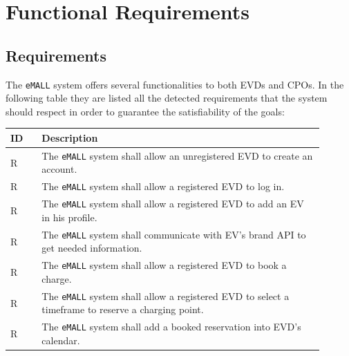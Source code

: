 \section{Functional Requirements}
\label{sec:functional_requirements}%

\subsection{Requirements}
\label{subsec: requirements}%
The \verb|eMALL| system offers several functionalities to both EVDs and CPOs.
In the following table they are listed all the detected requirements that the system should respect in order to guarantee
the satisfiability of the goals:
\newpage
{}
\setcounter{req}{1}
\newcommand{\creq}{\thereq\stepcounter{req}}
\begin{center}
    \begin{longtable}{|l|p{0.9\linewidth}|}
        \hline
        \textbf{ID} & \textbf{Description}                                                                                                                             \\
        \hline
        R\creq      & The \verb|eMALL| system shall allow an unregistered EVD to create an account.                                                                    \\
        \hline
        R\creq      & The \verb|eMALL| system shall allow a registered EVD to log in.                                                                                  \\
        \hline
        R\creq      & The \verb|eMALL| system shall allow a registered EVD to add an EV in his profile.                                                                \\
        \hline
        R\creq      & The \verb|eMALL| system shall communicate with EV's brand API to get needed information.                                                         \\
        \hline
        R\creq      & The \verb|eMALL| system shall allow a registered EVD to book a charge.                                                                           \\
        \hline
        R\creq      & The \verb|eMALL| system shall allow a registered EVD to select a timeframe to reserve a charging point.                                          \\
        \hline
        R\creq      & The \verb|eMALL| system shall add a booked reservation into EVD's calendar.                                                                      \\

\end{longtable}
\end{center}
